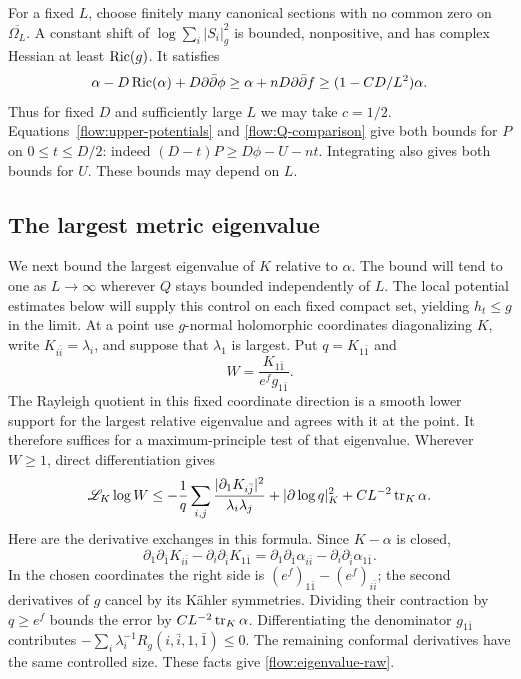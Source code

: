 For a fixed $L$, choose finitely many canonical sections with no common
zero on $\overline{\Omega_L}$.  A constant shift of
$\log\sum_i|S_i|_g^2$ is bounded, nonpositive, and has complex Hessian
at least $\operatorname{Ric}(g)$.  It satisfies
\[
 \alpha-D\operatorname{Ric}(\alpha)+D\partial\bar\partial\phi
 \ge \alpha+nD\partial\bar\partial f\ge(1-CD/L^2)\alpha.
\]
Thus for fixed $D$ and sufficiently large $L$ we may take $c=1/2$.
Equations~\eqref{flow:upper-potentials} and
\eqref{flow:Q-comparison} give both bounds for $P$ on $0\le t\le D/2$:
indeed $(D-t)P\ge D\phi-U-nt$.  Integrating also gives both bounds
for $U$.  These bounds may depend on $L$.

\subsection{The largest metric eigenvalue}

We next bound the largest eigenvalue of $K$ relative to $\alpha$.
The bound will tend to one as $L\to\infty$ wherever $Q$ stays bounded
independently of $L$.  The local potential estimates below will supply
this control on each fixed compact set, yielding $h_t\le g$ in the
limit.  At a point use $g$-normal holomorphic
coordinates diagonalizing $K$, write $K_{i\bar i}=\lambda_i$, and
suppose that $\lambda_1$ is largest.  Put $q=K_{1\bar1}$ and
\[
 W=\frac{K_{1\bar1}}{e^fg_{1\bar1}}.
\]
The Rayleigh quotient in this fixed coordinate direction is a smooth
lower support for the largest relative eigenvalue and agrees with it
at the point.  It therefore suffices for a maximum-principle test of
that eigenvalue.  Wherever $W\ge1$, direct differentiation gives
\begin{equation}\label{flow:eigenvalue-raw}
 \mathscr L_K\log W
 \le -\frac1q\sum_{i,j}
            \frac{|\partial_1K_{i\bar j}|^2}{\lambda_i\lambda_j}
       +|\partial\log q|_K^2
       +CL^{-2}\operatorname{tr}_K\alpha.
\end{equation}
Here are the derivative exchanges in this formula.  Since $K-\alpha$
is closed,
\[
 \partial_1\partial_{\bar1}K_{i\bar i}
 -\partial_i\partial_{\bar i}K_{1\bar1}
 =\partial_1\partial_{\bar1}\alpha_{i\bar i}
 -\partial_i\partial_{\bar i}\alpha_{1\bar1}.
\]
In the chosen coordinates the right side is
$(e^f)_{1\bar1}-(e^f)_{i\bar i}$; the second derivatives of $g$
cancel by its K\"ahler symmetries.  Dividing their contraction by
$q\ge e^f$ bounds the error by $CL^{-2}\operatorname{tr}_K\alpha$.
Differentiating the denominator $g_{1\bar1}$ contributes
$-\sum_i\lambda_i^{-1}R_g(i,\bar i,1,\bar1)\le0$.
The remaining conformal derivatives have the same controlled size.
These facts give \eqref{flow:eigenvalue-raw}.

